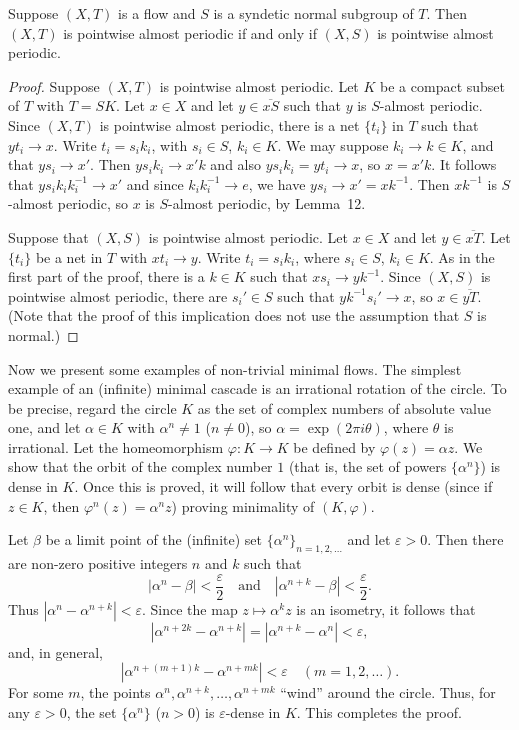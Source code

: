 \begin{theorem}
    Suppose $(X,T)$ is a flow and $S$ is a syndetic normal subgroup of $T$. Then $(X,T)$ is pointwise almost periodic if and only if $(X,S)$ is pointwise almost periodic.
\end{theorem}

\begin{proof}
    Suppose $(X,T)$ is pointwise almost periodic. Let $K$ be a compact subset of $T$ with $T = SK$. Let $x \in X$ and let $y \in \overline{xS}$ such that $y$ is $S$-almost periodic. Since $(X,T)$ is pointwise almost periodic, there is a net $\{t_i\}$ in $T$ such that $yt_i \to x$. Write $t_i = s_i k_i$, with $s_i \in S$, $k_i \in K$. We may suppose $k_i \to k \in K$, and that $ys_i \to x'$. Then $ys_i k_i \to x'k$ and also $ys_i k_i = yt_i \to x$, so $x = x'k$. It follows that $ys_i k_i k_i^{-1} \to x'$ and since $k_i k_i^{-1} \to e$, we have $ys_i \to x' = xk^{-1}$. Then $xk^{-1}$ is $S$-almost periodic, so $x$ is $S$-almost periodic, by Lemma~12.

    Suppose that $(X,S)$ is pointwise almost periodic. Let $x \in X$ and let $y \in \overline{xT}$. Let $\{t_i\}$ be a net in $T$ with $xt_i \to y$. Write $t_i = s_i k_i$, where $s_i \in S$, $k_i \in K$. As in the first part of the proof, there is a $k \in K$ such that $xs_i \to yk^{-1}$. Since $(X,S)$ is pointwise almost periodic, there are $s_i' \in S$ such that $yk^{-1}s_i' \to x$, so $x \in \overline{yT}$. (Note that the proof of this implication does not use the assumption that $S$ is normal.)
\end{proof}



Now we present some examples of non-trivial minimal flows. The simplest example of an (infinite) minimal cascade is an irrational rotation of the circle. To be precise, regard the circle $K$ as the set of complex numbers of absolute value one, and let $\alpha \in K$ with $\alpha^n \neq 1$ ($n \neq 0$), so $\alpha = \exp(2\pi i \theta)$, where $\theta$ is irrational. Let the homeomorphism $\varphi : K \to K$ be defined by $\varphi(z) = \alpha z$. We show that the orbit of the complex number $1$ (that is, the set of powers $\{\alpha^n\}$) is dense in $K$. Once this is proved, it will follow that every orbit is dense (since if $z \in K$, then $\varphi^n(z) = \alpha^n z$) proving minimality of $(K,\varphi)$.

Let $\beta$ be a limit point of the (infinite) set $\{\alpha^n\}_{n=1,2,\ldots}$ and let $\varepsilon > 0$. Then there are non-zero positive integers $n$ and $k$ such that
\[
    |\alpha^n - \beta| < \frac{\varepsilon}{2} \quad \text{and} \quad |\alpha^{n+k} - \beta| < \frac{\varepsilon}{2}.
\]
Thus $|\alpha^n - \alpha^{n+k}| < \varepsilon$. Since the map $z \mapsto \alpha^k z$ is an isometry, it follows that
\[
    |\alpha^{n+2k} - \alpha^{n+k}| = |\alpha^{n+k} - \alpha^n| < \varepsilon,
\]
and, in general,
\[
    |\alpha^{n+(m+1)k} - \alpha^{n+mk}| < \varepsilon \quad (m = 1,2,\ldots).
\]
For some $m$, the points $\alpha^n, \alpha^{n+k}, \ldots, \alpha^{n+mk}$ “wind” around the circle. Thus, for any $\varepsilon > 0$, the set $\{\alpha^n\}$ ($n > 0$) is $\varepsilon$-dense in $K$. This completes the proof.


